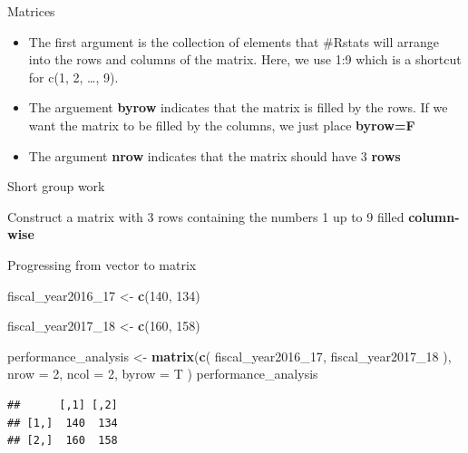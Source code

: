 \documentclass[
  ignorenonframetext,
]{beamer}
\newenvironment{Shaded}{\begin{snugshade}}{\end{snugshade}}
\newcommand{\DataTypeTok}[1]{\textcolor[rgb]{0.13,0.29,0.53}{#1}}
\newcommand{\DecValTok}[1]{\textcolor[rgb]{0.00,0.00,0.81}{#1}}
\newcommand{\KeywordTok}[1]{\textcolor[rgb]{0.13,0.29,0.53}{\textbf{#1}}}
\newcommand{\NormalTok}[1]{#1}
\newcommand{\StringTok}[1]{\textcolor[rgb]{0.31,0.60,0.02}{#1}}
\providecommand{\tightlist}{%
  \setlength{\itemsep}{0pt}\setlength{\parskip}{0pt}}
\begin{document}
\begin{frame}{Matrices}
\protect\hypertarget{matrices-1}{}

\begin{itemize}
\tightlist
\item
  The first argument is the collection of elements that \#Rstats will
  arrange into the rows and columns of the matrix. Here, we use 1:9
  which is a shortcut for c(1, 2, \ldots, 9).
\item
  The arguement \textbf{byrow} indicates that the matrix is filled by
  the rows. If we want the matrix to be filled by the columns, we just
  place \textbf{byrow=F}
\item
  The argument \textbf{nrow} indicates that the matrix should have 3
  \textbf{rows}
\end{itemize}

\end{frame}

\begin{frame}{Short group work}
\protect\hypertarget{short-group-work-2}{}

Construct a matrix with 3 rows containing the numbers 1 up to 9 filled
\textbf{column-wise}

\end{frame}

\begin{frame}[fragile]{Progressing from vector to matrix}
\protect\hypertarget{progressing-from-vector-to-matrix}{}

\begin{Shaded}
\begin{Highlighting}[]
\NormalTok{fiscal_year2016_}\DecValTok{17}\NormalTok{ <-}\StringTok{ }\KeywordTok{c}\NormalTok{(}\DecValTok{140}\NormalTok{, }\DecValTok{134}\NormalTok{)}

\NormalTok{fiscal_year2017_}\DecValTok{18}\NormalTok{ <-}\StringTok{ }\KeywordTok{c}\NormalTok{(}\DecValTok{160}\NormalTok{, }\DecValTok{158}\NormalTok{)}

\NormalTok{performance_analysis <-}\StringTok{ }\KeywordTok{matrix}\NormalTok{(}\KeywordTok{c}\NormalTok{(}
\NormalTok{  fiscal_year2016_}\DecValTok{17}\NormalTok{,}
\NormalTok{  fiscal_year2017_}\DecValTok{18}
\NormalTok{),}
\DataTypeTok{nrow =} \DecValTok{2}\NormalTok{,}
\DataTypeTok{ncol =} \DecValTok{2}\NormalTok{, }\DataTypeTok{byrow =}\NormalTok{ T}
\NormalTok{)}
\NormalTok{performance_analysis}
\end{Highlighting}
\end{Shaded}

\begin{verbatim}
##      [,1] [,2]
## [1,]  140  134
## [2,]  160  158
\end{verbatim}

\end{frame}
\end{document}
